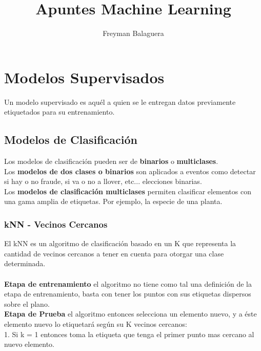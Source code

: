 \documentclass[]{article}
\title{Apuntes Machine Learning}
\author{Freyman Balaguera}
\begin{document}
\maketitle

\section{Modelos Supervisados}

Un modelo supervisado es aquél a quien se le entregan datos previamente etiquetados para su entrenamiento.

\subsection{ Modelos de Clasificación }

Los modelos de clasificación pueden ser de \textbf{binarios} o \textbf{multiclases}.\\

Los \textbf{modelos de dos clases o binarios} son aplicados a eventos como detectar si hay o no fraude, si va o no a llover, etc... elecciones binarias.\\

Los \textbf{modelos de clasificación multiclases} permiten clasificar elementos con una gama amplia de etiquetas. Por ejemplo, la especie de una planta.

\newpage
\subsubsection{kNN - Vecinos Cercanos}

El kNN es un algoritmo de clasificación basado en un K que representa la cantidad de vecinos cercanos a tener en cuenta para otorgar una clase determinada.\\\\

\textbf{Etapa de entrenamiento} el algoritmo no tiene como tal una definición de la etapa de entrenamiento, basta con tener los puntos con sus etiquetas dispersos sobre el plano.\\

\textbf{Etapa de Prueba} el algoritmo entonces selecciona un elemento nuevo, y a éste elemento nuevo lo etiquetará según su K vecinos cercanos:\\

1. Si k = 1 entonces toma la etiqueta que tenga el primer punto mas cercano al nuevo elemento.\\
\end{document}

